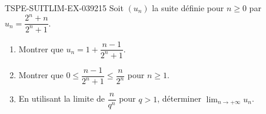 \begin{exercice}{TSPE-SUITLIM-EX-039}{2}{15}
Soit $(u_n)$ la suite définie pour $n \geq 0$ par $u_n = \dfrac{2^n + n}{2^n + 1}$.
\begin{enumerate}
  \item Montrer que $u_n = 1 + \dfrac{n - 1}{2^n + 1}$.
  \item Montrer que $0 \leq \dfrac{n-1}{2^n + 1} \leq \dfrac{n}{2^n}$ pour $n \geq 1$.
  \item En utilisant la limite de $\dfrac{n}{q^n}$ pour $q > 1$, déterminer $\lim_{n \to +\infty} u_n$.
\end{enumerate}
\end{exercice}
